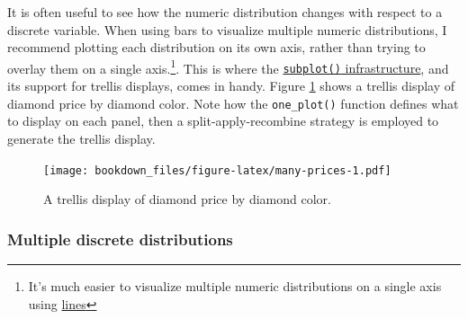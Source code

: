 \documentclass[12pt,]{isuthesis}
\newenvironment{Shaded}{\begin{snugshade}}{\end{snugshade}}
\newcommand{\KeywordTok}[1]{\textcolor[rgb]{0.13,0.29,0.53}{\textbf{{#1}}}}
\newcommand{\DataTypeTok}[1]{\textcolor[rgb]{0.13,0.29,0.53}{{#1}}}
\newcommand{\DecValTok}[1]{\textcolor[rgb]{0.00,0.00,0.81}{{#1}}}
\newcommand{\FloatTok}[1]{\textcolor[rgb]{0.00,0.00,0.81}{{#1}}}
\newcommand{\StringTok}[1]{\textcolor[rgb]{0.31,0.60,0.02}{{#1}}}
\newcommand{\OtherTok}[1]{\textcolor[rgb]{0.56,0.35,0.01}{{#1}}}
\newcommand{\NormalTok}[1]{{#1}}
\let\rmarkdownfootnote\footnote%
\def\footnote{\protect\rmarkdownfootnote}
\begin{document}
It is often useful to see how the numeric distribution changes with
respect to a discrete variable. When using bars to visualize multiple
numeric distributions, I recommend plotting each distribution on its own
axis, rather than trying to overlay them on a single axis.\footnote{It's
  much easier to visualize multiple numeric distributions on a single
  axis using \protect\hyperlink{lines}{lines}}. This is where the
\protect\hyperlink{subplot}{\texttt{subplot()} infrastructure}, and its
support for trellis displays, comes in handy. Figure
\ref{fig:many-prices} shows a trellis display of diamond price by
diamond color. Note how the \texttt{one\_plot()} function defines what
to display on each panel, then a split-apply-recombine strategy is
employed to generate the trellis display.

\begin{Shaded}
\end{Shaded}

\begin{figure}[htbp]
\centering
\texttt{[image: bookdown\_files/figure-latex/many-prices-1.pdf]}
\caption{\label{fig:many-prices}A trellis display of diamond price by
diamond color.}
\end{figure}

\subsubsection{Multiple discrete
distributions}\label{multiple-discrete-distributions}
\end{document}
